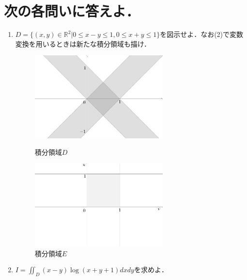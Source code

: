 \documentclass[a4paper,10pt]{jarticle}
\begin{document}
\newpage
\section{次の各問いに答えよ．}
\begin{enumerate}
\item $D=\{(x,y) \in \mathbb{R}^2 | 0 \leq x-y \leq 1, 0 \leq x+y \leq 1\}$を図示せよ．なお(2)で変数変換を用いるときは新たな積分領域も描け．

\begin{figure}[h]\begin{minipage}{0.5\hsize}
	\begin{center}
		\includegraphics[width=70mm,bb  = 0 0 300 200]{31.png}
	\end{center}
 	\caption{積分領域$D$}
\end{minipage}
\begin{minipage}{0.5\hsize}
	\begin{center}
		\includegraphics[width=70mm,bb  = 0 0 300 200]{32.png}
	\end{center}
	\caption{積分領域$E$}
\end{minipage}
\end{figure}

\item$ I = \iint_{D} (x-y)\log{(x+y+1)}dxdy $を求めよ．


\end{enumerate}
\end{document}

